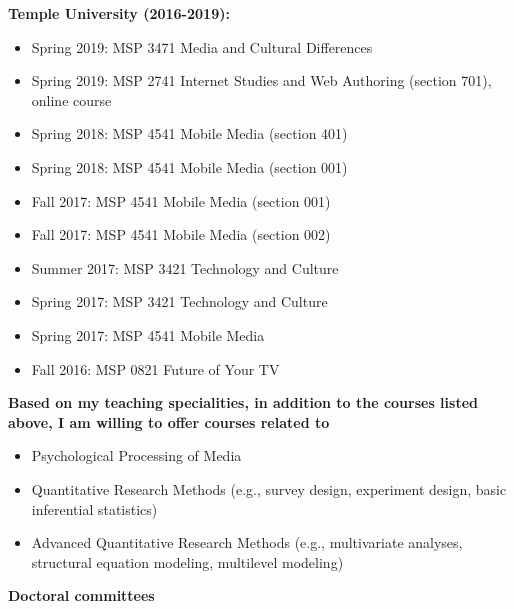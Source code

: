 \documentclass[]{article}
\providecommand{\tightlist}{%
  \setlength{\itemsep}{0pt}\setlength{\parskip}{0pt}}
\begin{document}
\textbf{Temple University (2016-2019):}

\begin{itemize}
\tightlist
\item
  Spring 2019: MSP 3471 Media and Cultural Differences
\item
  Spring 2019: MSP 2741 Internet Studies and Web Authoring (section
  701), online course
\item
  Spring 2018: MSP 4541 Mobile Media (section 401)
\item
  Spring 2018: MSP 4541 Mobile Media (section 001)
\item
  Fall 2017: MSP 4541 Mobile Media (section 001)
\item
  Fall 2017: MSP 4541 Mobile Media (section 002)
\item
  Summer 2017: MSP 3421 Technology and Culture
\item
  Spring 2017: MSP 3421 Technology and Culture
\item
  Spring 2017: MSP 4541 Mobile Media
\item
  Fall 2016: MSP 0821 Future of Your TV
\end{itemize}

\textbf{Based on my teaching specialities, in addition to the courses
listed above, I am willing to offer courses related to}

\begin{itemize}
\tightlist
\item
  Psychological Processing of Media
\item
  Quantitative Research Methods (e.g., survey design, experiment design,
  basic inferential statistics)
\item
  Advanced Quantitative Research Methods (e.g., multivariate analyses,
  structural equation modeling, multilevel modeling)
\end{itemize}

\textbf{Doctoral committees}
\end{document}
